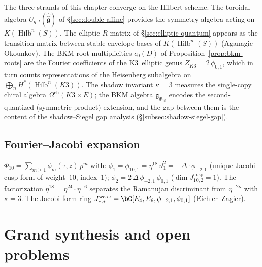 \begin{remark}
\label{rem:bridge-synthesis}
The three strands of this chapter converge on the Hilbert scheme.
The toroidal algebra $U_{q,t}(\hat{\hat{\mathfrak{g}}})$ of
\S\ref{sec:double-affine} provides the symmetry algebra
acting on $K(\operatorname{Hilb}^n(S))$.
The elliptic $R$-matrix of
\S\ref{sec:elliptic-quantum} appears as the transition
matrix between stable-envelope bases of $K(\operatorname{Hilb}^n(S))$
(Aganagic--Okounkov).
The BKM root multiplicities $c_0(D)$ of
Proposition~\ref{prop:bkm-roots} are the Fourier coefficients of the
K3~elliptic genus $Z_{K3} = 2\,\phi_{0,1}$, which in turn
counts representations of the Heisenberg subalgebra on
$\bigoplus_n H^*(\operatorname{Hilb}^n(K3))$.
The shadow invariant $\kappa = 3$ measures the single-copy
chiral algebra $\Omega^{\mathrm{ch}}(K3 \times E)$; the BKM algebra
$\mathfrak{g}_{\Phi_{10}}$ encodes the second-quantized
(symmetric-product) extension, and the gap between them is the content
of the shadow--Siegel gap analysis
(\S\ref{subsec:shadow-siegel-gap}).
\end{remark}


\subsection{Fourier--Jacobi expansion}
\label{subsec:fj-expansion}

\begin{remark}
\label{rem:fj-structure}
$\Phi_{10} = \sum_{m \geq 1} \phi_m(\tau,z)\,p^m$ with:
$\phi_1 = \phi_{10,1} = \eta^{18}\,\vartheta_1^2 =
-\Delta \cdot \phi_{-2,1}$
(unique Jacobi cusp form of weight~$10$, index~$1$);
$\phi_2 = 2\,\Delta\,\phi_{-2,1}\,\phi_{0,1}$
($\dim J_{10,2}^{\mathrm{cusp}} = 1$).
The factorization $\eta^{18} = \eta^{24} \cdot \eta^{-6}$
separates the Ramanujan discriminant from
$\eta^{-2\kappa}$ with $\kappa = 3$. The Jacobi form ring
$J_{*,*}^{\mathrm{weak}} = \bC[E_4, E_6, \phi_{-2,1},
\phi_{0,1}]$ (Eichler--Zagier).
\end{remark}



\section{Grand synthesis and open problems}
\label{sec:grand-synthesis-k3xe}

